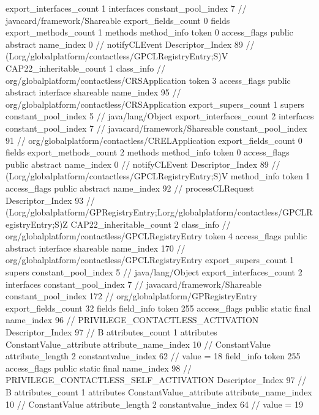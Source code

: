 {{{{			}
			export_interfaces_count	1
			interfaces {
				constant_pool_index	7		// javacard/framework/Shareable
			}
			export_fields_count	0
			fields {
			}
			export_methods_count	1
			methods {
				method_info {
					token	0
					access_flags	public abstract
					name_index	0		// notifyCLEvent
					Descriptor_Index	89		// (Lorg/globalplatform/contactless/GPCLRegistryEntry;S)V
				}
			}
			CAP22_inheritable_count	1
		}
		class_info {		// org/globalplatform/contactless/CRSApplication
			token	3
			access_flags	public abstract interface shareable
			name_index	95		// org/globalplatform/contactless/CRSApplication
			export_supers_count	1
			supers {
				constant_pool_index	5		// java/lang/Object
			}
			export_interfaces_count	2
			interfaces {
				constant_pool_index	7		// javacard/framework/Shareable
				constant_pool_index	91		// org/globalplatform/contactless/CRELApplication
			}
			export_fields_count	0
			fields {
			}
			export_methods_count	2
			methods {
				method_info {
					token	0
					access_flags	public abstract
					name_index	0		// notifyCLEvent
					Descriptor_Index	89		// (Lorg/globalplatform/contactless/GPCLRegistryEntry;S)V
				}
				method_info {
					token	1
					access_flags	public abstract
					name_index	92		// processCLRequest
					Descriptor_Index	93		// (Lorg/globalplatform/GPRegistryEntry;Lorg/globalplatform/contactless/GPCLRegistryEntry;S)Z
				}
			}
			CAP22_inheritable_count	2
		}
		class_info {		// org/globalplatform/contactless/GPCLRegistryEntry
			token	4
			access_flags	public abstract interface shareable
			name_index	170		// org/globalplatform/contactless/GPCLRegistryEntry
			export_supers_count	1
			supers {
				constant_pool_index	5		// java/lang/Object
			}
			export_interfaces_count	2
			interfaces {
				constant_pool_index	7		// javacard/framework/Shareable
				constant_pool_index	172		// org/globalplatform/GPRegistryEntry
			}
			export_fields_count	32
			fields {
			field_info {
				token	255
				access_flags	public static final
				name_index	96		// PRIVILEGE_CONTACTLESS_ACTIVATION
				Descriptor_Index	97		// B
				attributes_count	1
				attributes {
				ConstantValue_attribute {
					attribute_name_index	10		// ConstantValue
					attribute_length	2
					constantvalue_index	62		// value = 18
				}
				}
			}
			field_info {
				token	255
				access_flags	public static final
				name_index	98		// PRIVILEGE_CONTACTLESS_SELF_ACTIVATION
				Descriptor_Index	97		// B
				attributes_count	1
				attributes {
				ConstantValue_attribute {
					attribute_name_index	10		// ConstantValue
					attribute_length	2
					constantvalue_index	64		// value = 19
}}}}}}}
